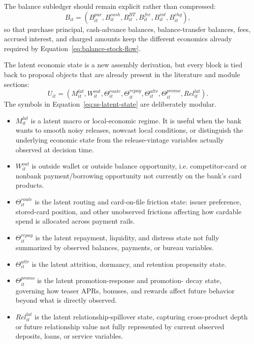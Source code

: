 \documentclass[11pt]{article}
\newcommand{\1}{\mathbf{1}}
\begin{document}
The balance subledger should remain explicit rather than compressed:
\begin{equation}
  B_{it}
  =
  (B^{pur}_{it},B^{cash}_{it},B^{BT}_{it},B^{fee}_{it},B^{int}_{it},B^{chg}_{it}),
  \label{eq:ss-balance-subledger}
\end{equation}
so that purchase principal, cash-advance balances, balance-transfer balances,
fees, accrued interest, and charged amounts keep the different economics already
required by Equation~\eqref{eq:balance-stock-flow}.

The latent economic state is a new assembly derivation, but every block is tied
back to proposal objects that are already present in the literature and module
sections:
\begin{equation}
  U_{it}
  =
  (M^{lat}_{it},W^{out}_{it},\Theta^{route}_{it},\Theta^{repay}_{it},
   \Theta^{attr}_{it},\Theta^{promo}_{it},Rel^{lat}_{it}).
  \label{eq:ss-latent-state}
\end{equation}
The symbols in Equation~\eqref{eq:ss-latent-state} are deliberately modular.
\begin{itemize}[leftmargin=*]
  \item $M^{lat}_{it}$ is a latent macro or local-economic regime. It is useful
        when the bank wants to smooth noisy releases, nowcast local conditions,
        or distinguish the underlying economic state from the release-vintage
        variables actually observed at decision time.
  \item $W^{out}_{it}$ is outside wallet or outside balance opportunity, i.e.
        competitor-card or nonbank payment/borrowing opportunity not currently
        on the bank's card products.
  \item $\Theta^{route}_{it}$ is the latent routing and card-on-file friction
        state: issuer preference, stored-card position, and other unobserved
        frictions affecting how cardable spend is allocated across payment rails.
  \item $\Theta^{repay}_{it}$ is the latent repayment, liquidity, and distress
        state not fully summarized by observed balances, payments, or bureau
        variables.
  \item $\Theta^{attr}_{it}$ is the latent attrition, dormancy, and retention
        propensity state.
  \item $\Theta^{promo}_{it}$ is the latent promotion-response and promotion-
        decay state, governing how teaser APRs, bonuses, and rewards affect
        future behavior beyond what is directly observed.
  \item $Rel^{lat}_{it}$ is the latent relationship-spillover state, capturing
        cross-product depth or future relationship value not fully represented by
        current observed deposits, loans, or service variables.
\end{itemize}
\end{document}
